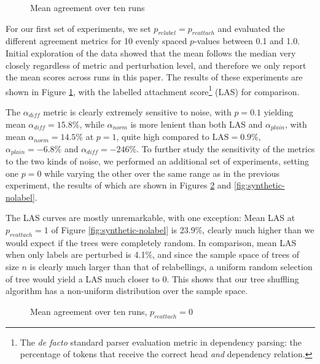 \documentclass[11pt]{article}
\begin{document}
\begin{figure}
    \begin{center}
        
    \end{center}
    \caption{Mean agreement over ten runs}
    \label{fig:synthetic-initial}
\end{figure}

For our first set of experiments, we set $p_{relabel}=p_{reattach}$ and
evaluated the different agreement metrics for 10 evenly spaced $p$-values
between 0.1 and 1.0. Initial exploration of the data showed that the mean
follows the median very closely regardless of metric and perturbation level,
and therefore we only report the mean scores across runs in this paper. The
results of these experiments are shown in Figure \ref{fig:synthetic-initial},
with the labelled attachment score\footnote{The \emph{de facto} standard
parser evaluation metric in dependency parsing: the percentage of tokens that
receive the correct head \emph{and} dependency relation.} (LAS) for
comparison.

The $\alpha_{diff}$ metric is clearly extremely sensitive to noise, with
$p=0.1$ yielding mean $\alpha_{diff}=15.8\%$, while $\alpha_{norm}$ is more
lenient than both LAS and $\alpha_{plain}$, with mean $\alpha_{norm}=14.5\%$
at $p=1$, quite high compared to $\textrm{LAS}=0.9\%$, $\alpha_{plain}=-6.8\%$
and $\alpha_{diff}=-246\%$. To further study the sensitivity of the metrics to
the two kinds of noise, we performed an additional set of experiments, setting
one $p=0$ while varying the other over the same range as in the previous
experiment, the results of which are shown in Figures
\ref{fig:synthetic-noattach} and \ref{fig:synthetic-nolabel}.

The LAS curves are mostly unremarkable, with one exception: Mean LAS at
$p_{reattach}=1$ of Figure \ref{fig:synthetic-nolabel} is 23.9\%, clearly much
higher than we would expect if the trees were completely random. In
comparison, mean LAS when only labels are perturbed is 4.1\%, and since the
sample space of trees of size $n$ is clearly much larger than that of
relabellings, a uniform random selection of tree would yield a LAS much closer
to 0. This shows that our tree shuffling algorithm has a non-uniform
distribution over the sample space.

\begin{figure}
    \begin{center}
        
    \end{center}
    \caption{Mean agreement over ten runs, $p_{reattach} = 0$}
    \label{fig:synthetic-noattach}
\end{figure}
\end{document}
